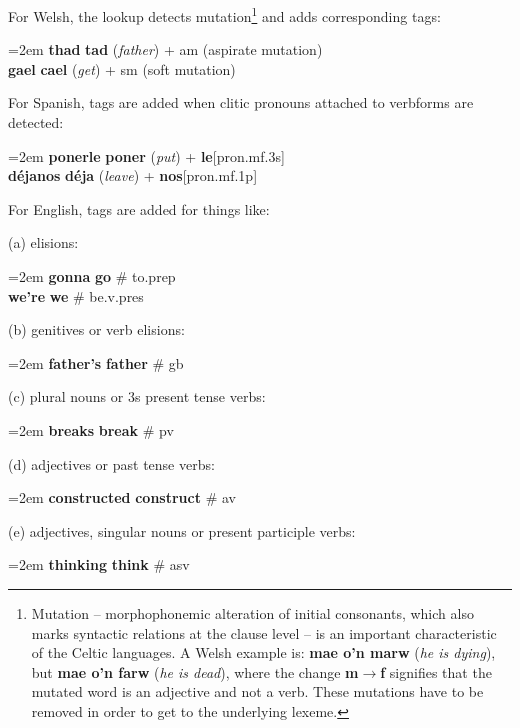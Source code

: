 \documentclass[11pt]{article}
\begin{document}
For Welsh, the lookup detects mutation\footnote{Mutation -- morphophonemic alteration of initial consonants, which also marks syntactic relations at the clause level -- is an important characteristic of the Celtic languages. A Welsh example is: \textbf{mae o'n marw} (\textit{he is dying}), but \textbf{mae o'n farw} (\textit{he is dead}), where the change \textbf{m$\rightarrow$f} signifies that the mutated word is an adjective and not a verb. These mutations have to be removed in order to get to the underlying lexeme.} and adds corresponding tags:

\noindent
\hangindent=2em
\textbf{thad} \textrightarrow \textbf{tad} (\textit{father}) + am (aspirate mutation) \\
\textbf{gael} \textrightarrow \textbf{cael} (\textit{get}) + sm (soft mutation) 

For Spanish, tags are added when clitic pronouns attached to verbforms are detected:

\noindent
\hangindent=2em
\textbf{ponerle} \textrightarrow \textbf{poner} (\textit{put}) + \textbf{le}[pron.mf.3s] \\
\textbf{déjanos} \textrightarrow \textbf{déja} (\textit{leave}) + \textbf{nos}[pron.mf.1p]
                                                                  
For English, tags are added for things like:

\noindent
(a) elisions:

\noindent
\hangindent=2em
\textbf{gonna} \textrightarrow \textbf{go} \# to.prep \\
\textbf{we're} \textrightarrow \textbf{we} \# be.v.pres

\noindent
(b) genitives or verb elisions:

\noindent
\hangindent=2em
\textbf{father's} \textrightarrow \textbf{father} \# gb

\noindent
(c) plural nouns or 3s present tense verbs:

\noindent
\hangindent=2em
\textbf{breaks} \textrightarrow \textbf{break} \# pv

\noindent
(d) adjectives or past tense verbs:

\noindent
\hangindent=2em
\textbf{constructed} \textrightarrow \textbf{construct} \# av

\noindent
(e) adjectives, singular nouns or present participle verbs:

\noindent
\hangindent=2em
\textbf{thinking} \textrightarrow \textbf{think} \# asv
\end{document}
